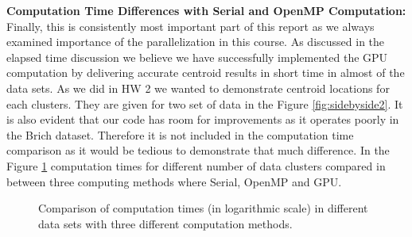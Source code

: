 \documentclass{article}
\begin{document}
\textbf{Computation Time Differences with Serial and OpenMP Computation:}
Finally, this is consistently most important part of this report as we always examined importance of the parallelization in this course. As discussed in the elapsed time discussion we believe we have successfully implemented the GPU computation by delivering accurate centroid results in short time in almost of the data sets. As we did in HW 2 we wanted to demonstrate centroid locations for each clusters. They are given for two set of data in the Figure \ref{fig:sidebyside2}. It is also evident that our code has room for improvements as it operates poorly in the Brich dataset. Therefore it is not included in the computation time comparison as it would be tedious to demonstrate that much difference. In the Figure \ref{fig:timecomp} computation times for different number of data clusters compared in between three computing methods where Serial, OpenMP and GPU.

\begin{figure}[htb]
    \centering
    \caption{Comparison of computation times (in logarithmic scale) in different data sets with three different computation methods.}
    \label{fig:timecomp}
\end{figure}
\end{document}
